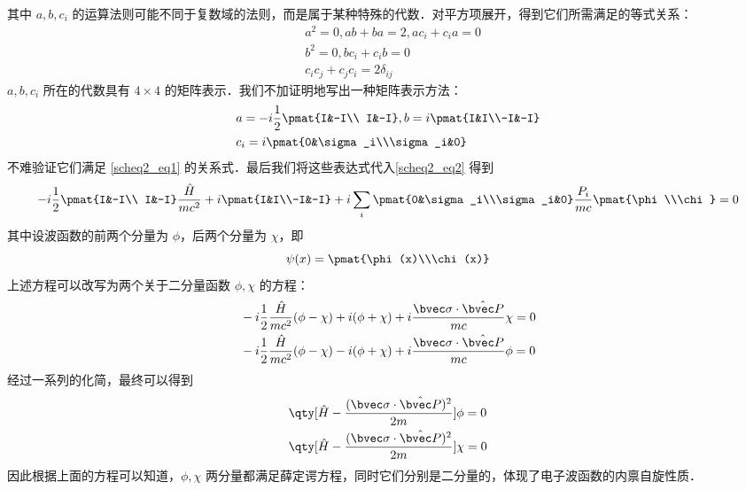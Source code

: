 其中 $a,b,c_i$ 的运算法则可能不同于复数域的法则，而是属于某种特殊的代数．对平方项展开，得到它们所需满足的等式关系：
\begin{equation}\label{scheq2_eq1}
\begin{aligned}
&a^2=0,ab+ba=2,ac_i+c_ia=0\\
&b^2=0,bc_i+c_ib=0\\
&c_ic_j+c_jc_i=2\delta_{ij}
\end{aligned}
\end{equation}
$a,b,c_i$ 所在的代数具有 $4\times 4$ 的矩阵表示．我们不加证明地写出一种矩阵表示方法：
\begin{equation}
\begin{aligned}
&a=-i\frac{1}{2}\pmat{I&-I\\ I&-I},b=i\pmat{I&I\\-I&-I}\\
&c_i=i\pmat{0&\sigma_i\\\sigma_i&0}
\end{aligned}
\end{equation}
不难验证它们满足 \autoref{scheq2_eq1} 的关系式．最后我们将这些表达式代入\autoref{scheq2_eq2} 得到
\begin{equation}
-i\frac{1}{2}\pmat{I&-I\\ I&-I} \frac{\hat H}{mc^2}+i\pmat{I&I\\-I&-I}+i\sum_i\pmat{0&\sigma_i\\\sigma_i&0} \frac{P_i}{mc}\pmat{\phi\\\chi}=0
\end{equation}
其中设波函数的前两个分量为 $\phi$，后两个分量为 $\chi$，即
\begin{equation}
\psi(x)=\pmat{\phi(x)\\\chi(x)}
\end{equation}
上述方程可以改写为两个关于二分量函数 $\phi,\chi$ 的方程：
\begin{equation}
\begin{aligned}
&-i\frac{1}{2}\frac{\hat H}{mc^2}(\phi-\chi)+i(\phi+\chi)+i\frac{\bvec \sigma\cdot \hat{\bvec P}}{mc}\chi=0\\
&-i\frac{1}{2}\frac{\hat H}{mc^2}(\phi-\chi)-i(\phi+\chi)+i\frac{\bvec \sigma\cdot \hat{\bvec P}}{mc}\phi=0
\end{aligned}
\end{equation}
经过一系列的化简，最终可以得到
\begin{equation}\label{scheq2_eq3}
\begin{aligned}
&\qty[\hat H-\frac{(\bvec \sigma\cdot \hat{\bvec P})^2}{2m}]\phi=0\\
&
\qty[\hat H-\frac{(\bvec \sigma\cdot \hat{\bvec P})^2}{2m}]\chi=0
\end{aligned}
\end{equation}
因此根据上面的方程可以知道，$\phi,\chi$ 两分量都满足薛定谔方程，同时它们分别是二分量的，体现了电子波函数的内禀自旋性质．

